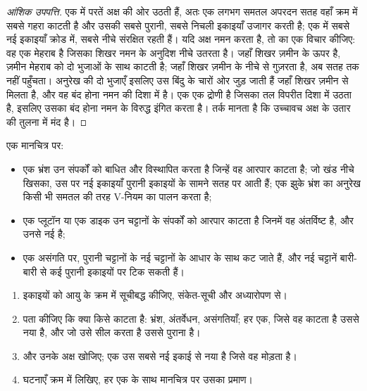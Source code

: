 \begin{proof}[आंशिक उपपत्ति]
एक  में परतें अक्ष की ओर उठती हैं, अतः एक लगभग समतल अपरदन सतह वहाँ क्रम में सबसे गहरा काटती है और उसकी
सबसे पुरानी, सबसे निचली इकाइयाँ उजागर करती है; एक  में सबसे नई इकाइयाँ क्रोड में, सबसे नीचे संरक्षित रहती
हैं। यदि अक्ष नमन करता है, तो  का एक  विचार कीजिए: वह एक मेहराब है जिसका शिखर नमन के अनुदिश नीचे
उतरता है। जहाँ शिखर ज़मीन के ऊपर है, ज़मीन मेहराब को दो भुजाओं के साथ काटती है; जहाँ शिखर ज़मीन के नीचे से
गुज़रता है,  अब सतह तक नहीं पहुँचता। अनुरेख की दो भुजाएँ इसलिए उस बिंदु के चारों ओर जुड़ जाती हैं जहाँ
शिखर ज़मीन से मिलता है, और वह बंद होना नमन की दिशा में है। एक  एक द्रोणी है जिसका तल विपरीत दिशा में
उठता है, इसलिए उसका बंद होना नमन के विरुद्ध इंगित करता है। तर्क मानता है कि उच्चावच अक्ष के उतार की तुलना में
मंद है।
\end{proof}

\begin{proposition}[भ्रंश, अंतर्वेधन और असंगतियाँ]\label{prop:b1:geological-maps:cuts}
एक मानचित्र पर:
\begin{itemize}
  \item एक भ्रंश उन संपर्कों को बाधित और विस्थापित करता है जिन्हें वह आरपार काटता है; जो खंड नीचे खिसका, उस पर
        नई इकाइयाँ पुरानी इकाइयों के सामने सतह पर आती हैं; एक झुके भ्रंश का अनुरेख किसी भी समतल की तरह V-नियम
        का पालन करता है;
  \item एक प्लूटॉन या एक डाइक उन चट्टानों के संपर्कों को आरपार काटता है जिनमें वह अंतर्विष्ट है, और उनसे नई है;
  \item एक असंगति पर, पुरानी चट्टानों के  नई चट्टानों के आधार के साथ कट जाते हैं, और नई चट्टानें बारी-बारी
        से कई पुरानी इकाइयों पर टिक सकती हैं।
\end{itemize}
\end{proposition}

\begin{method}[मानचित्र से इतिहास पढ़ना]\label{met:b1:geological-maps:history}
\begin{enumerate}
  \item इकाइयों को आयु के क्रम में सूचीबद्ध कीजिए, संकेत-सूची और अध्यारोपण से।
  \item पता कीजिए कि क्या किसे काटता है: भ्रंश, अंतर्वेधन, असंगतियाँ; हर एक, जिसे वह काटता है उससे नया है, और जो
        उसे सील करता है उससे पुराना है।
  \item {} और उनके अक्ष खोजिए; एक  उस सबसे नई इकाई से नया है जिसे वह मोड़ता है।
  \item घटनाएँ क्रम में लिखिए, हर एक के साथ मानचित्र पर उसका प्रमाण।
\end{enumerate}
\end{method}

